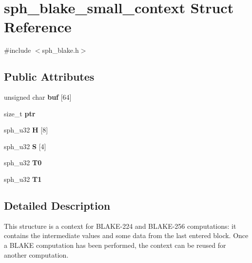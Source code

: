\hypertarget{structsph__blake__small__context}{}\section{sph\+\_\+blake\+\_\+small\+\_\+context Struct Reference}
\label{structsph__blake__small__context}


{\ttfamily \#include $<$sph\+\_\+blake.\+h$>$}

\subsection*{Public Attributes}
\begin{DoxyCompactItemize}
\item 
\mbox{\label{structsph__blake__small__context_af9d5fc7974274fb2947c3b3f4b37963d}} 
unsigned char {\bfseries buf} \mbox{[}64\mbox{]}
\item 
\mbox{\label{structsph__blake__small__context_aa1c49e1bd07dd9e346d4dafe22552d72}} 
size\+\_\+t {\bfseries ptr}
\item 
\mbox{\label{structsph__blake__small__context_a0a860270f4fdff75da67e257f358b4f8}} 
sph\+\_\+u32 {\bfseries H} \mbox{[}8\mbox{]}
\item 
\mbox{\label{structsph__blake__small__context_ab61df4e8f58da409a243f225237aa6c2}} 
sph\+\_\+u32 {\bfseries S} \mbox{[}4\mbox{]}
\item 
\mbox{\label{structsph__blake__small__context_a17be56c2d6b9110e390720851b33429e}} 
sph\+\_\+u32 {\bfseries T0}
\item 
\mbox{\label{structsph__blake__small__context_a494dd406d70bcd90e976cf915cf87f02}} 
sph\+\_\+u32 {\bfseries T1}
\end{DoxyCompactItemize}


\subsection{Detailed Description}
This structure is a context for B\+L\+A\+K\+E-\/224 and B\+L\+A\+K\+E-\/256 computations\+: it contains the intermediate values and some data from the last entered block. Once a B\+L\+A\+KE computation has been performed, the context can be reused for another computation.

